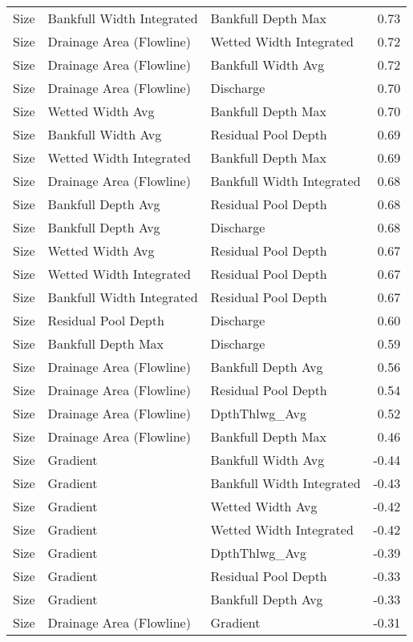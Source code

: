 \documentclass[
  12pt,
]{article}
\begin{document}
\begin{longtable}[t]{>{\raggedright\arraybackslash}p{1in}>{\raggedright\arraybackslash}p{2in}>{\raggedright\arraybackslash}p{2in}r}
Size & Bankfull Width Integrated & Bankfull Depth Max & 0.73\\
Size & Drainage Area (Flowline) & Wetted Width Integrated & 0.72\\
Size & Drainage Area (Flowline) & Bankfull Width Avg & 0.72\\
Size & Drainage Area (Flowline) & Discharge & 0.70\\
\addlinespace
Size & Wetted Width Avg & Bankfull Depth Max & 0.70\\
Size & Bankfull Width Avg & Residual Pool Depth & 0.69\\
Size & Wetted Width Integrated & Bankfull Depth Max & 0.69\\
Size & Drainage Area (Flowline) & Bankfull Width Integrated & 0.68\\
Size & Bankfull Depth Avg & Residual Pool Depth & 0.68\\
\addlinespace
Size & Bankfull Depth Avg & Discharge & 0.68\\
Size & Wetted Width Avg & Residual Pool Depth & 0.67\\
Size & Wetted Width Integrated & Residual Pool Depth & 0.67\\
Size & Bankfull Width Integrated & Residual Pool Depth & 0.67\\
Size & Residual Pool Depth & Discharge & 0.60\\
\addlinespace
Size & Bankfull Depth Max & Discharge & 0.59\\
Size & Drainage Area (Flowline) & Bankfull Depth Avg & 0.56\\
Size & Drainage Area (Flowline) & Residual Pool Depth & 0.54\\
Size & Drainage Area (Flowline) & DpthThlwg\_Avg & 0.52\\
Size & Drainage Area (Flowline) & Bankfull Depth Max & 0.46\\
\addlinespace
Size & Gradient & Bankfull Width Avg & -0.44\\
Size & Gradient & Bankfull Width Integrated & -0.43\\
Size & Gradient & Wetted Width Avg & -0.42\\
Size & Gradient & Wetted Width Integrated & -0.42\\
Size & Gradient & DpthThlwg\_Avg & -0.39\\
\addlinespace
Size & Gradient & Residual Pool Depth & -0.33\\
Size & Gradient & Bankfull Depth Avg & -0.33\\
Size & Drainage Area (Flowline) & Gradient & -0.31\\

\end{longtable}
\end{document}
